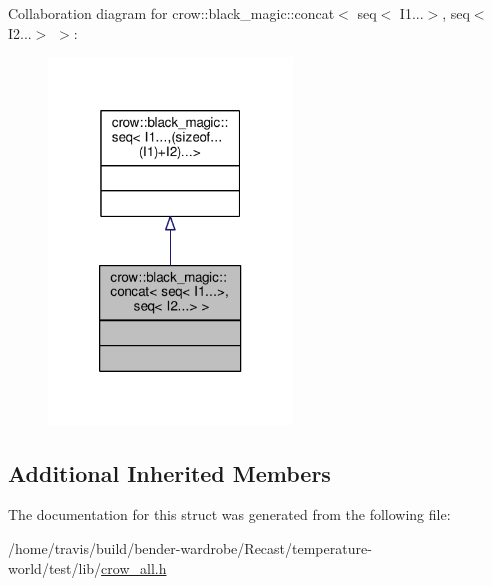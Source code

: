 Collaboration diagram for crow\-:\-:black\-\_\-magic\-:\-:concat$<$ seq$<$ I1...$>$, seq$<$ I2...$>$ $>$\-:
\nopagebreak
\begin{figure}[H]
\begin{center}
\leavevmode
\includegraphics[width=184pt]{structcrow_1_1black__magic_1_1concat_3_01seq_3_01_i1_8_8_8_4_00_01seq_3_01_i2_8_8_8_4_01_4__coll__graph}
\end{center}
\end{figure}
\subsection*{Additional Inherited Members}


The documentation for this struct was generated from the following file\-:\begin{DoxyCompactItemize}
\item 
/home/travis/build/bender-\/wardrobe/\-Recast/temperature-\/world/test/lib/\hyperlink{crow__all_8h}{crow\-\_\-all.\-h}\end{DoxyCompactItemize}
